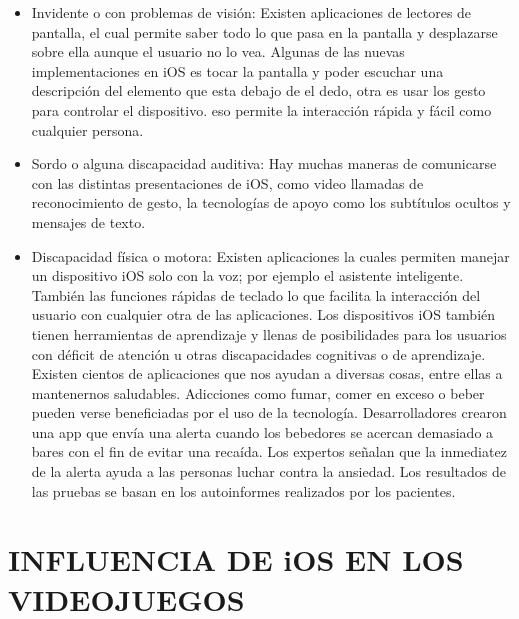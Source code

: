 \begin{itemize}
  \item Invidente o con problemas de visión:
    Existen aplicaciones de lectores de pantalla, el cual permite
    saber todo lo que pasa en la pantalla y desplazarse sobre ella
    aunque el usuario no lo vea. Algunas de las nuevas
    implementaciones en iOS es tocar la pantalla y poder escuchar
    una descripción del elemento que esta debajo de el dedo, otra es
    usar los gesto para controlar el dispositivo. eso permite la
    interacción rápida y fácil como cualquier persona.
    
  \item Sordo o alguna discapacidad auditiva:
    Hay muchas maneras de comunicarse con las distintas   
    presentaciones de iOS, como video llamadas de reconocimiento
    de gesto, la tecnologías de apoyo como los subtítulos ocultos y
    mensajes de texto.
    
  \item Discapacidad física o motora:
    Existen aplicaciones la cuales permiten manejar un dispositivo
    iOS solo con la voz; por ejemplo el asistente inteligente.
    También las funciones rápidas de teclado lo que facilita la
    interacción del usuario con cualquier otra de las aplicaciones.
    Los dispositivos iOS también tienen herramientas de
    aprendizaje y llenas de posibilidades para los usuarios con
    déficit de atención u otras discapacidades cognitivas o de
    aprendizaje.
    Existen cientos de aplicaciones que nos ayudan a diversas cosas,
    entre ellas a mantenernos saludables. Adicciones como fumar,
    comer en exceso o beber pueden verse beneficiadas por el uso
    de la tecnología. Desarrolladores crearon una app que envía una
    alerta cuando los bebedores se acercan demasiado a bares con
    el fin de evitar una recaída. Los expertos señalan que la
    inmediatez de la alerta ayuda a las personas luchar contra la
    ansiedad. Los resultados de las pruebas se basan en los autoinformes
    realizados por los pacientes.
\end{itemize}

\section*{INFLUENCIA DE iOS EN LOS VIDEOJUEGOS}

